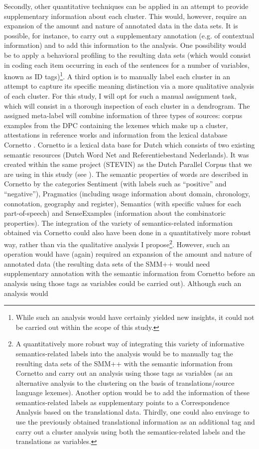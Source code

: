 Secondly, other quantitative techniques can be applied in an attempt to provide supplementary information about each cluster. This would, however, require an expansion of the amount and nature of annotated data in the data sets. It is possible, for instance, to carry out a supplementary annotation (e.g. of contextual information) and to add this information to the analysis. One possibility would be to apply a behavioral profiling \citep{divjak_ways_2006, divjak_clusters_2008, evans_behavioral_2009} to the resulting data sets (which would consist in coding each item occurring in each of the sentences for a number of variables, known as ID tags)\footnote{While such an analysis would have certainly yielded new insights, it could not be carried out within the scope of this study.}. A third option is to manually label each cluster in an attempt to capture its specific meaning distinction via a more qualitative analysis of each cluster. For this study, I will opt for such a manual assignment task, which will consist in a thorough inspection of each cluster in a dendrogram. The assigned meta-label will combine information of three types of sources: corpus examples from the DPC containing the lexemes which make up a cluster, attestations in reference works and information from the lexical database Cornetto \citep{vossen_cornetto_2008, spyns_cornetto:_2013}. Cornetto is a lexical data base for Dutch which consists of two existing semantic resources (Dutch Word Net and Referentiebestand Nederlands). It was created within the same project (STEVIN) as the Dutch Parallel Corpus that we are using in this study (see ). The semantic properties of words are described in Cornetto by the categories Sentiment (with labels such as ``positive'' and ``negative''), Pragmatics (including usage information about domain, chronology, connotation, geography and register), Semantics (with specific values for each part-of-speech) and SenseExamples (information about the combinatoric properties). The integration of the variety of semantics-related information obtained via Cornetto could also have been done in a quantitatively more robust way, rather than via the qualitative analysis I propose\footnote{A quantitatively more robust way of integrating this variety of informative semantics-related labels into the analysis would be to manually tag the resulting data sets of the SMM++ with the semantic information from Cornetto and carry out an analysis using those tags as variables (as an alternative analysis to the clustering on the basis of translations\slash source language lexemes). Another option would be to add the information of these semantics-related labels as supplementary points to a Correspondence Analysis based on the translational data. Thirdly, one could also envisage to use the previously obtained translational information as an additional tag and carry out a cluster analysis using both the semantics-related labels and the translations as variables.}. However, such an operation would have (again) required an expansion of the amount and nature of annotated data (the resulting data sets of the SMM++ would need supplementary annotation with the semantic information from Cornetto before an analysis using those tags as variables could be carried out). Although such an analysis would 